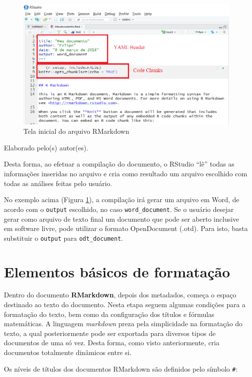 \documentclass[12pt,brazil,oneside]{book}
\begin{document}
\begin{figure}[H]

{\centering \includegraphics[width=0.7\linewidth]{rmark2} 

}

\caption{Tela inicial do arquivo RMarkdown}\label{fig:rmark2}
\end{figure}

Elaborado pelo(s) autor(es).

Desta forma, ao efetuar a compilação do documento, o RStudio ``lê'' todas as informações inseridas no arquivo e cria como resultado um arquivo escolhido com todas as análises feitas pelo usuário.

No exemplo acima (Figura \ref{fig:rmark2}), a compilação irá gerar um arquivo em Word, de acordo com o \texttt{output} escolhido, no caso \texttt{word\_document}. Se o usuário desejar gerar como arquivo de texto final um documento que pode ser aberto inclusive em software livre, pode utilizar o formato OpenDocument (.otd). Para isto, basta substituir o \texttt{output} para \texttt{odt\_document}.

\hypertarget{elementos-basicos-de-formatacao}{%
\section{Elementos básicos de formatação}\label{elementos-basicos-de-formatacao}}

Dentro do documento \textbf{RMarkdown}, depois dos metadados, começa o espaço destinado ao texto do documento. Nesta etapa seguem algumas condições para a formatação do texto, bem como da configuração dos títulos e fórmulas matemáticas. A linguagem \emph{markdown} preza pela simplicidade na formatação do texto, a qual posteriormente pode ser exportada para diversos tipos de documentos de uma só vez. Desta forma, como visto anteriormente, cria documentos totalmente dinâmicos entre si.

Os níveis de títulos dos documentos RMarkdown são definidos pelo símbolo \texttt{\#}:
\end{document}

